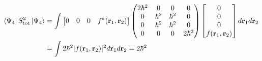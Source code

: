 \documentclass[12pt]{report}
\theoremstyle{custom}
\newcommand{\rb}{\bold{r}}
\begin{document}
\begin{align*}
  \bra{\Psi_4}S_{\text{tot}}^2 \ket{\Psi_4} &= \int \begin{bmatrix} 0 & 0 & 0 & f^*(\rb_1,\rb_2) \end{bmatrix} \begin{pmatrix}2\hbar^2 & 0 & 0 & 0 \\ 0 & \hbar^2 & \hbar^2 & 0 \\ 0 & \hbar^2 & \hbar^2 & 0 \\ 0 & 0 & 0 & 2\hbar^2\end{pmatrix}  \begin{bmatrix} 0 \\ 0 \\ 0 \\ f(\rb_1,\rb_2) \end{bmatrix} d\rb_1 d\rb_2 \\
                                            &=  \int 2\hbar^2 |f(\rb_1,\rb_2)|^2 d\rb_1 d\rb_2 = 2\hbar^2
\end{align*}
\end{document}
